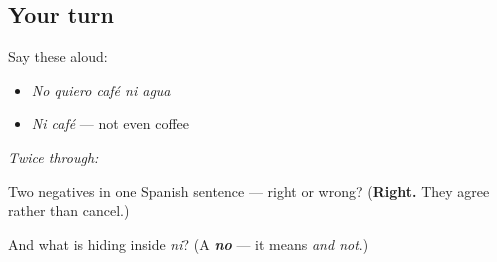 \subsection*{Your turn}
Say these aloud:

\begin{itemize}
\raggedright
  \item \emph{No quiero café ni agua}
  \item \emph{Ni café} — not even coffee
\end{itemize}

\emph{Twice through:}

\begin{tcolorbox}[breakable,colback=teal!4,colframe=teal!35!black,title={Before you move on}]
Two negatives in one Spanish sentence — right or wrong? (\textbf{Right.} They agree rather than cancel.)

And what is hiding inside \emph{ni}? (A \emph{\textbf{no}} — it means \emph{and not}.)
\end{tcolorbox}
